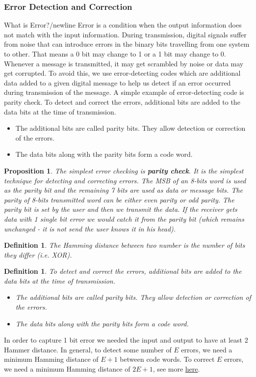 \documentclass[a4paper,twoside]{article}
\newtheorem{proposition}[theorem]{Proposition}
\newtheorem{definition}[theorem]{Definition}
\numberwithin{equation}{section}
\begin{document}
\subsubsection{Error Detection and Correction}
What is Error?/newline
Error is a condition when the output information does not match with the input information.
During transmission, digital signals suffer from noise that can introduce errors in the binary bits
travelling from one system to other. That means a 0 bit may change to 1 or a 1 bit may change to 0.
Whenever a message is transmitted, it may get scrambled by noise or data may get corrupted. To avoid
this, we use error-detecting codes which are additional data added to a given digital message to
help us detect if an error occurred during transmission of the message. A simple example of
error-detecting code is parity check. To detect and correct the errors, additional bits are added
to the data bits at the time of transmission.
\begin{itemize}
    \item The additional bits are called parity bits. They allow detection or correction of the errors.
    \item The data bits along with the parity bits form a code word.
\end{itemize}
\begin{proposition}
    The simplest error checking is \textbf{parity check}. It is the simplest technique for detecting
     and correcting errors.
    The MSB of an 8-bits word is used as the parity bit and the remaining 7 bits are used as data or
    message bits. The parity of 8-bits transmitted word can be either even parity or odd parity.
    The parity bit is set by the user and then we transmit the data. If the receiver gets data with
    1 single bit error we would catch it from the parity bit (which remains unchanged - it is not send
    the user knows it in his head).
\end{proposition}
\begin{definition}
    The Hamming distance between two number is the number of bits they differ (i.e. XOR).
\end{definition}
\begin{definition}
    To detect and correct the errors, additional bits are added to the data bits at the time of transmission.
    \begin{itemize}
        \item  The additional bits are called parity bits. They allow detection or correction of
              the errors.
        \item  The data bits along with the parity bits form a code word.
    \end{itemize}
\end{definition}
In order to capture 1 bit error we needed the input and output to have at least 2 Hammer distance.
In general, to detect some number of $E$ errors, we need a minimum Hamming distance of $E+1$ between
 code words. To correct $E$ errors, we need a minimum Hamming distance of $2E+1$, see more
 \href{https://www.youtube.com/watch?v=2IQxigpPMns&list=PLUl4u3cNGP62WVs95MNq3dQBqY2vGOtQ2&index=16&ab_channel=MITOpenCourseWare}{here}.
\end{document}
